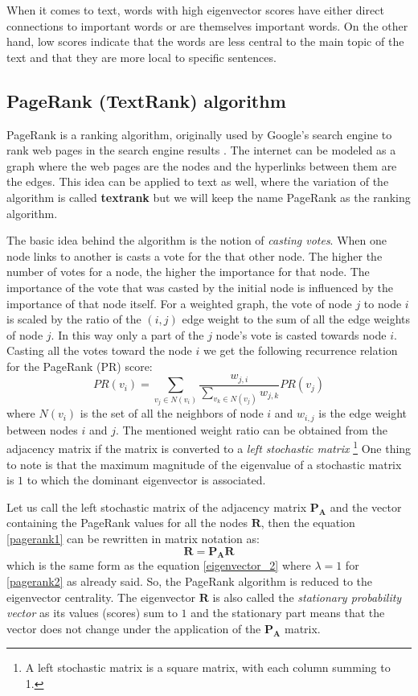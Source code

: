\documentclass[12pt]{article}
\numberwithin{equation}{section}
\begin{document}
\begin{spacing}{1.5}
	When it comes to text, words with high eigenvector scores have either direct connections to important words or are themselves important words. On the other hand, low scores indicate that the words are less central to the main topic of the text and that they are more local to specific sentences.
	
	\subsection{PageRank (TextRank) algorithm}
	PageRank is a ranking algorithm, originally used by Google's search engine to rank web pages in the search engine results \cite{pagerank}. The internet can be modeled as a graph where the web pages are the nodes and the hyperlinks between them are the edges. This idea can be applied to text as well, where the variation of the algorithm is called \textbf{textrank} \cite{textrank} but we will keep the name PageRank as the ranking algorithm.
	
	The basic idea behind the algorithm is the notion of \textit{casting votes}. When one node links to another is casts a vote for the that other node. The higher the number of votes for a node, the higher the importance for that node. The importance of the vote that was casted by the initial node is influenced by the importance of that node itself. For a weighted graph, the vote of node $j$ to node $i$ is scaled by the ratio of the $(i,j)$ edge weight to the sum of all the edge weights of node $j$. In this way only a part of the $j$ node's vote is casted towards node $i$. Casting all the votes toward the node $i$ we get the following recurrence relation for the PageRank (PR) score: 
	\begin{equation}\label{pagerank1}
		PR(v_i) = \sum_{v_j \in N(v_i)} \frac{w_{j,i}}{\sum_{v_k \in N(v_j)} w_{j,k}} PR(v_j) 
	\end{equation}
	where $N(v_i)$ is the set of all the neighbors of node $i$ and $w_{i,j}$ is the edge weight between nodes $i$ and $j$. The mentioned weight ratio can be obtained from the adjacency matrix if the matrix is converted to a \textit{left stochastic matrix} \footnote{A left stochastic matrix is a square matrix, with each column summing to 1.} One thing to note is that the maximum magnitude of the eigenvalue of a stochastic matrix is $1$ to which the dominant eigenvector is associated.
	
	Let us call the left stochastic matrix of the adjacency matrix $\mathbf{P}_\mathbf{A}$ and the vector containing the PageRank values for all the nodes $\mathbf{R}$, then the equation \ref{pagerank1} can be rewritten in matrix notation as:
	\begin{equation}\label{pagerank2}
		\mathbf{R} = \mathbf{P}_\mathbf{A} \mathbf{R}
	\end{equation}
	which is the same form as the equation \ref{eigenvector_2} where $\lambda = 1$ for \ref{pagerank2} as already said. So, the PageRank algorithm is reduced to the eigenvector centrality. The eigenvector $\mathbf{R}$ is also called the \textit{stationary probability vector} as its values (scores) sum to $1$ and the stationary part means that the vector does not change under the application of the $\mathbf{P}_\mathbf{A}$ matrix. 
	

\end{spacing}
\end{document}
